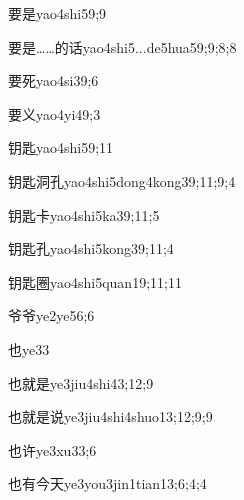 \begin{verbete}{要是}{yao4shi5}{9;9}
\end{verbete}
\begin{verbete}{要是……的话}{yao4shi5...de5hua5}{9;9;8;8}
\end{verbete}
\begin{verbete}{要死}{yao4si3}{9;6}
\end{verbete}
\begin{verbete}{要义}{yao4yi4}{9;3}
\end{verbete}
\begin{verbete}{钥匙}{yao4shi5}{9;11}
\end{verbete}
\begin{verbete}{钥匙洞孔}{yao4shi5dong4kong3}{9;11;9;4}
\end{verbete}
\begin{verbete}{钥匙卡}{yao4shi5ka3}{9;11;5}
\end{verbete}
\begin{verbete}{钥匙孔}{yao4shi5kong3}{9;11;4}
\end{verbete}
\begin{verbete}{钥匙圈}{yao4shi5quan1}{9;11;11}
\end{verbete}
\begin{verbete}{爷爷}{ye2ye5}{6;6}
\end{verbete}
\begin{verbete}{也}{ye3}{3}
\end{verbete}
\begin{verbete}{也就是}{ye3jiu4shi4}{3;12;9}
\end{verbete}
\begin{verbete}{也就是说}{ye3jiu4shi4shuo1}{3;12;9;9}
\end{verbete}
\begin{verbete}{也许}{ye3xu3}{3;6}
\end{verbete}
\begin{verbete}{也有今天}{ye3you3jin1tian1}{3;6;4;4}
\end{verbete}
